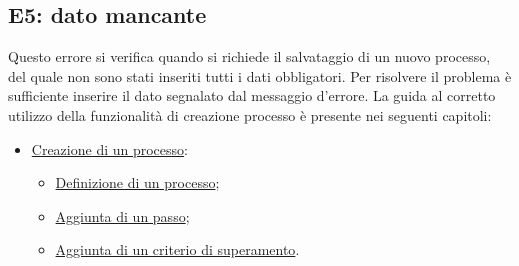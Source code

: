 \subsection{E5: dato mancante}
\label{e5}
Questo errore si verifica quando si richiede il salvataggio di un nuovo processo, del quale non sono stati inseriti tutti i dati obbligatori.
Per risolvere il problema è sufficiente inserire il dato segnalato dal messaggio d'errore.
La guida al corretto utilizzo della funzionalità di creazione processo è presente nei seguenti capitoli:
\begin{itemize}
\item \hyperref[creazione]{Creazione di un processo}:
\begin{itemize}
\item \hyperref[definizione]{Definizione di un processo};
\item \hyperref[addstep]{Aggiunta di un passo};
\item \hyperref[vincoli]{Aggiunta di un criterio di superamento}.
\end{itemize}
\end{itemize}